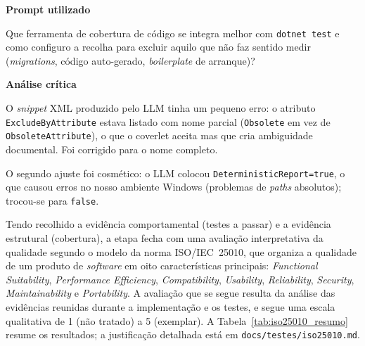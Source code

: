     \begin{tcolorbox}[title=Interação com o LLM]
    \textbf{Prompt utilizado}

    Que ferramenta de cobertura de código se integra melhor com \texttt{dotnet test} e como configuro a recolha para excluir aquilo que não faz sentido medir (\textit{migrations}, código auto-gerado, \textit{boilerplate} de arranque)?

    \tcblower

    \textbf{Análise crítica}

    O \textit{snippet} XML produzido pelo LLM tinha um pequeno erro: o atributo \texttt{ExcludeByAttribute} estava listado com nome parcial (\texttt{Obsolete} em vez de \texttt{ObsoleteAttribute}), o que o coverlet aceita mas que cria ambiguidade documental. Foi corrigido para o nome completo.

    O segundo ajuste foi cosmético: o LLM colocou \texttt{DeterministicReport=true}, o que causou erros no nosso ambiente Windows (problemas de \textit{paths} absolutos); trocou-se para \texttt{false}.
    \end{tcolorbox}

    Tendo recolhido a evidência comportamental (testes a passar) e a evidência estrutural (cobertura), a etapa fecha com uma avaliação interpretativa da qualidade segundo o modelo da norma ISO/IEC~25010, que organiza a qualidade de um produto de \textit{software} em oito características principais: \textit{Functional Suitability}, \textit{Performance Efficiency}, \textit{Compatibility}, \textit{Usability}, \textit{Reliability}, \textit{Security}, \textit{Maintainability} e \textit{Portability}. A avaliação que se segue resulta da análise das evidências reunidas durante a implementação e os testes, e segue uma escala qualitativa de 1 (não tratado) a 5 (exemplar). A Tabela~\ref{tab:iso25010_resumo} resume os resultados; a justificação detalhada está em \texttt{docs/testes/iso25010.md}.

